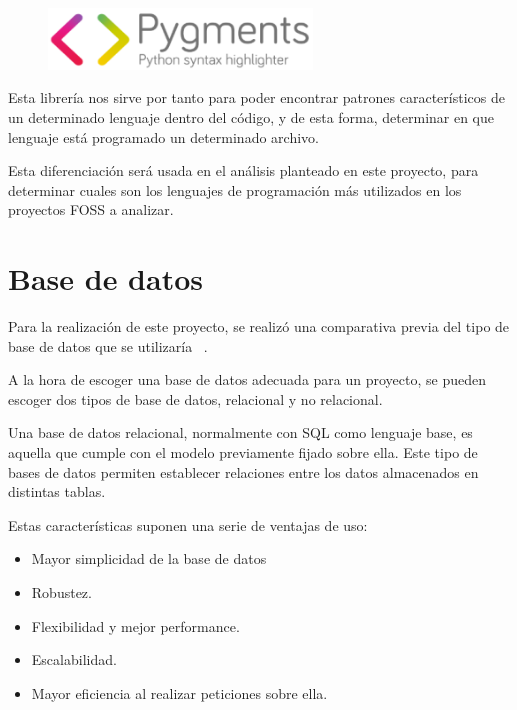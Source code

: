 \documentclass[a4paper, spanish, 12pt]{book}
\begin{document}
\begin{figure}[H]
  \centering
  \includegraphics[width=7cm, keepaspectratio]{img/pygments-logo}
\end{figure}

Esta librer\'ia nos sirve por tanto para poder encontrar patrones caracter\'isticos
de un determinado lenguaje dentro del c\'odigo, y de esta forma, determinar en que
lenguaje est\'a programado un determinado archivo.

Esta diferenciaci\'on ser\'a usada en el an\'alisis planteado en este proyecto,
para determinar cuales son los lenguajes de programaci\'on m\'as utilizados
en los proyectos FOSS a analizar.

\section{Base de datos}
\label{sec:database}

Para la realizaci\'on de este proyecto, se realiz\'o una comparativa previa del
tipo de base de datos que se utilizar\'ia ~\cite{sqlvsnosql}.

A la hora de escoger una base de datos adecuada para un proyecto, se pueden
escoger dos tipos de base de datos, relacional y no relacional.

Una base de datos relacional, normalmente con SQL como lenguaje base, es aquella
que cumple con el modelo previamente fijado sobre ella. Este tipo de bases de datos
permiten establecer relaciones entre los datos almacenados en distintas tablas.

Estas caracter\'isticas suponen una serie de ventajas de uso:

\begin{itemize}

\item Mayor simplicidad de la base de datos

\item Robustez.

\item Flexibilidad y mejor performance.

\item Escalabilidad.

\item Mayor eficiencia al realizar peticiones sobre ella.

\end{itemize}
\end{document}
